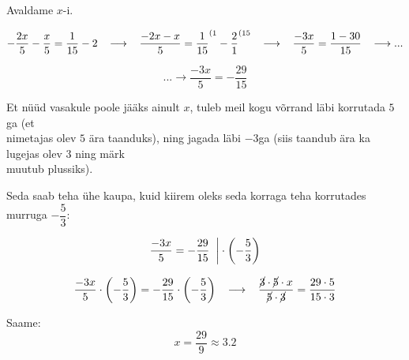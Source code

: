 \begin{center}
{{{\begin{flushleft}
\hspace{5mm}
Avaldame $x$-i.

\[-\dfrac{2x}{5}-\dfrac{x}{5}=\dfrac{1}{15}-2 \hspace{3mm} \longrightarrow \hspace{3mm} \dfrac{-2x-x}{5}=\dfrac{1}{15}^{(1}-\dfrac{2}{1}^{(15} \hspace{3mm} \longrightarrow \hspace{3mm} \dfrac{-3x}{5}=\dfrac{1-30}{15} \hspace{3mm} \longrightarrow ... \]


\[... \longrightarrow \dfrac{-3x}{5}=-\dfrac{29}{15} \]

\hspace{5mm}
Et nüüd vasakule poole jääks ainult $x$, tuleb meil kogu võrrand läbi korrutada $5$ga (et\\ \hspace{5mm} nimetajas olev $5$ ära taanduks), ning jagada läbi $-3$ga (siis taandub ära ka lugejas olev $3$ ning märk\\ \hspace{5mm} muutub plussiks). 

\vspace{2mm}
\hspace{5mm}
Seda saab teha ühe kaupa, kuid kiirem oleks seda korraga teha korrutades murruga $-\dfrac{5}{3}$:

\[ \dfrac{-3x}{5}=-\dfrac{29}{15} \hspace{2mm} \bigg| \cdot \left( -\dfrac{5}{3} \right) \]

\[ \dfrac{-3x}{5}\cdot \left(- \dfrac{5}{3} \right)= -\dfrac{29}{15} \cdot \left( - \dfrac{5}{3} \right) \hspace{3mm} \longrightarrow \hspace{3mm} \dfrac{\cancel{3} \cdot \cancel{5} \cdot x}{\cancel{5} \cdot \cancel{3}}=\dfrac{29 \cdot 5}{15 \cdot 3} \]

\hspace{5mm}
Saame: 
\[ x= \dfrac{29}{9} \approx 3.2 \]

\end{flushleft}
}}}
\end{center}

\pagebreak

